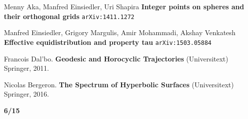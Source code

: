 \documentclass[12pt]{article}
\begin{document}
\selectfont \fontsize{12.5}{15}\selectfont


\begin{thebibliography}{} 

\item Menny Aka, Manfred Einsiedler, Uri Shapira \textbf{Integer points on spheres and their orthogonal grids} \texttt{arXiv:1411.1272}

\item Manfred Einsiedler, Grigory Margulis, Amir Mohammadi, Akshay Venkatesh \textbf{Effective equidistribution and property tau} \texttt{arXiv:1503.05884}


\item Francois Dal'bo. \textbf{Geodesic and Horocyclic Trajectories} (Universitext) Springer, 2011.

\item Nicolas Bergeron. \textbf{The Spectrum of Hyperbolic Surfaces} (Universitext) Springer, 2016.



\end{thebibliography}

\newpage

\noindent \textbf{6/15}
\end{document}
